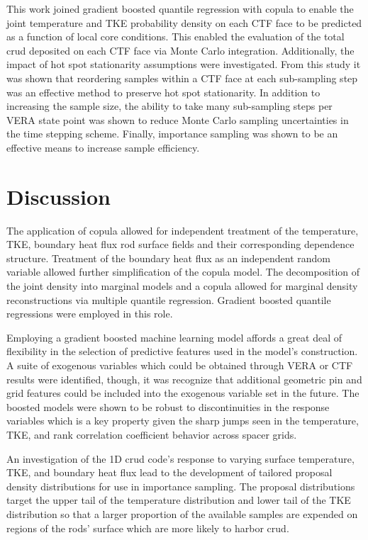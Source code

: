 
This work joined gradient boosted quantile regression with copula to enable the joint temperature and TKE probability density on each CTF face to be predicted as a function of local core conditions.  This enabled the evaluation of the total crud deposited on each CTF face via Monte Carlo integration.  Additionally, the impact of hot spot stationarity assumptions were investigated.  From this study it was shown that reordering samples within a CTF face at each sub-sampling step was an effective method to preserve hot spot stationarity.  In addition to increasing the sample size, the ability to take many sub-sampling steps per VERA state point was shown to reduce Monte Carlo sampling uncertainties in the time stepping scheme.  Finally, importance sampling was shown to be an effective means to increase sample efficiency.

\section{Discussion}

The application of copula allowed for independent treatment of the temperature, TKE, boundary heat flux rod surface fields and their corresponding dependence structure.  Treatment of the boundary heat flux as an independent random variable allowed further simplification of the copula model.  The decomposition of the joint density into marginal models and a copula allowed for marginal density reconstructions via multiple quantile regression.  Gradient boosted quantile regressions were employed in this role.

Employing a gradient boosted machine learning model affords a great deal of flexibility in the selection of predictive features used in the model's construction.  A suite of exogenous variables which could be obtained through VERA or CTF results were identified, though, it was recognize that additional geometric pin and grid features could be included into the exogenous variable set in the future.  The boosted models were shown to be robust to discontinuities in the response variables which is a key property given the sharp jumps seen in the temperature, TKE, and rank correlation coefficient behavior across spacer grids. 

An investigation of the 1D crud code's response to varying surface temperature, TKE, and boundary heat flux lead to the development of tailored proposal density distributions for use in importance sampling.   The proposal distributions target the upper tail of the temperature distribution and lower tail of the TKE distribution so that a larger proportion of the available samples are expended on regions of the rods' surface which are more likely to harbor crud.  

